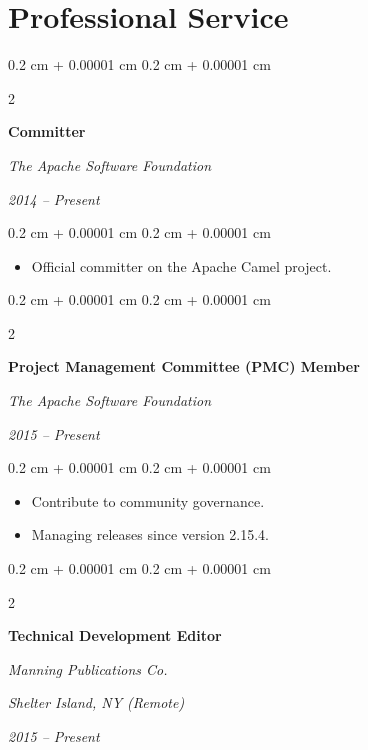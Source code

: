 \documentclass[10pt, a4paper]{article}
\newenvironment{highlights}{
    \begin{itemize}[
        topsep=0.10 cm,
        parsep=0.10 cm,
        partopsep=0pt,
        itemsep=0pt,
        leftmargin=0.4 cm + 10pt
    ]
}{
    \end{itemize}
} %
\newenvironment{onecolentry}{
    \begin{adjustwidth}{
        0.2 cm + 0.00001 cm
    }{
        0.2 cm + 0.00001 cm
    }
}{
    \end{adjustwidth}
} %
\newenvironment{twocolentry}[2][6cm]{ %
    \onecolentry
    \def\secondColumn{#2}
    \setcolumnwidth{\fill, #1} %
    \begin{paracol}{2}
}{
    \switchcolumn \raggedleft \secondColumn
    \end{paracol}
    \endonecolentry
} %
\begin{document}
\vspace{0.20 cm}



\section{Professional Service}
\begin{twocolentry}{
        \textit{2014 – Present}}
    \textbf{Committer}

    \textit{The Apache Software Foundation}
\end{twocolentry}

\vspace{0.10 cm}
\begin{onecolentry}
    \begin{highlights}
        \item Official committer on the Apache Camel project.
    \end{highlights}
\end{onecolentry}

\vspace{0.20 cm}

\begin{twocolentry}{
        \textit{2015 – Present}}
    \textbf{Project Management Committee (PMC) Member}

    \textit{The Apache Software Foundation}
\end{twocolentry}

\vspace{0.10 cm}
\begin{onecolentry}
    \begin{highlights}
        \item Contribute to community governance.
        \item Managing releases since version 2.15.4.
    \end{highlights}
\end{onecolentry}

\vspace{0.20 cm}

\begin{twocolentry}{
        \textit{Shelter Island, NY (Remote)}

        \textit{2015 – Present}}
    \textbf{Technical Development Editor}

    \textit{Manning Publications Co.}
\end{twocolentry}
\end{document}
